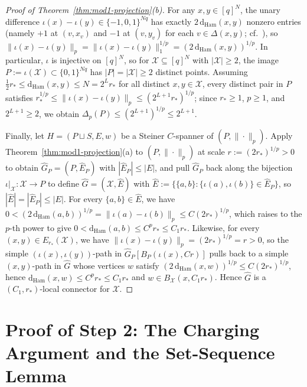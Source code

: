 \documentclass[11pt]{article}
\theoremstyle{definition}
\theoremstyle{remark}
\newcommand{\Ham}{\mathrm{Ham}}
\newcommand{\dHam}{\mathrm{d}_{\Ham}}
\begin{document}
\begin{proof}[Proof of Theorem~\ref{thm:mod1-projection}(b)]
For any $x, y \in [q]^N$, the unary difference $\iota(x) - \iota(y) \in \{-1, 0, 1\}^{N q}$ has exactly $2\,\dHam(x, y)$ nonzero entries (namely $+1$ at $(v, x_v)$ and $-1$ at $(v, y_v)$ for each $v \in \Delta(x, y)$; cf.~\cite{deza1997geometry}), so $\|\iota(x) - \iota(y)\|_p = \|\iota(x) - \iota(y)\|_1^{1/p} = (2\,\dHam(x, y))^{1/p}$. In particular, $\iota$ is injective on $[q]^N$, so for $\mathcal{X} \subseteq [q]^N$ with $|\mathcal{X}| \ge 2$, the image $P := \iota(\mathcal{X}) \subset \{0, 1\}^{N q}$ has $|P| = |\mathcal{X}| \ge 2$ distinct points. Assuming $\frac{1}{2} r_* \le \dHam(x, y) \le N = 2^L r_*$ for all distinct $x, y \in \mathcal{X}$, every distinct pair in $P$ satisfies $r_*^{1/p} \le \|\iota(x) - \iota(y)\|_p \le (2^{L+1} r_*)^{1/p}$; since $r_* \ge 1$, $p \ge 1$, and $2^{L+1} \ge 2$, we obtain $\Delta_p(P) \le (2^{L+1})^{1/p} \le 2^{L+1}$.

Finally, let $H = (P \sqcup S, E, w)$ be a Steiner $C$-spanner of $(P, \|\cdot\|_p)$. Apply Theorem~\ref{thm:mod1-projection}(a) to $(P, \|\cdot\|_p)$ at scale $r := (2 r_*)^{1/p} > 0$ to obtain $\widehat{G}_P = (P, \widehat{E}_P)$ with $|\widehat{E}_P| \le |E|$, and pull $\widehat{G}_P$ back along the bijection $\iota|_{\mathcal{X}} : \mathcal{X} \to P$ to define $\widehat{G} = (\mathcal{X}, \widehat{E})$ with $\widehat{E} := \{\{a, b\} : \{\iota(a), \iota(b)\} \in \widehat{E}_P\}$, so $|\widehat{E}| = |\widehat{E}_P| \le |E|$. For every $\{a, b\} \in \widehat{E}$, we have $0 < (2\,\dHam(a, b))^{1/p} = \|\iota(a) - \iota(b)\|_p \le C(2 r_*)^{1/p}$, which raises to the $p$-th power to give $0 < \dHam(a, b) \le C^p r_* \le C_1 r_*$. Likewise, for every $(x, y) \in E_{r_*}(\mathcal{X})$, we have $\|\iota(x) - \iota(y)\|_p = (2 r_*)^{1/p} = r > 0$, so the simple $(\iota(x), \iota(y))$-path in $\widehat{G}_P[B_P(\iota(x), C r)]$ pulls back to a simple $(x, y)$-path in $\widehat{G}$ whose vertices $w$ satisfy $(2\,\dHam(x, w))^{1/p} \le C(2 r_*)^{1/p}$, hence $\dHam(x, w) \le C^p r_* \le C_1 r_*$ and $w \in B_{\mathcal{X}}(x, C_1 r_*)$. Hence $\widehat{G}$ is a $(C_1, r_*)$-local connector for $\mathcal{X}$.
\end{proof}


\section{Proof of Step 2: The Charging Argument and the Set-Sequence Lemma}
\label{sec:combinatorics}
\end{document}
